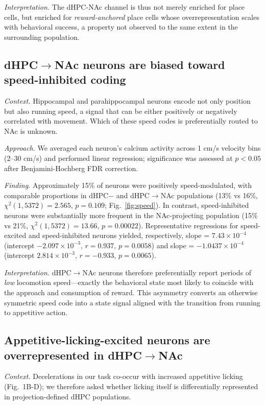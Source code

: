 \documentclass[11pt]{article}
\begin{document}
\textit{Interpretation.} The dHPC-NAc channel is thus not merely enriched for place cells, but enriched for \emph{reward-anchored} place cells whose overrepresentation scales with behavioral success, a property not observed to the same extent in the surrounding population.

\subsection{dHPC$\rightarrow$NAc neurons are biased toward speed-inhibited coding}

\textit{Context.} Hippocampal and parahippocampal neurons encode not only position but also running speed, a signal that can be either positively or negatively correlated with movement. Which of these speed codes is preferentially routed to NAc is unknown.

\textit{Approach.} We averaged each neuron's calcium activity across 1 cm/s velocity bins (2--30 cm/s) and performed linear regression; significance was assessed at $p<0.05$ after Benjamini-Hochberg FDR correction.

\textit{Finding.} Approximately 15\% of neurons were positively speed-modulated, with comparable proportions in dHPC$-$ and dHPC$\rightarrow$NAc populations (13\% vs 16\%, $\chi^2(1,5372)=2.565$, $p=0.109$; Fig.~\ref{fig:speed}). In contrast, speed-inhibited neurons were substantially more frequent in the NAc-projecting population (15\% vs 21\%, $\chi^2(1,5372)=13.66$, $p=0.00022$). Representative regressions for speed-excited and speed-inhibited neurons yielded, respectively, slope = $7.43\times10^{-4}$ (intercept $-2.097\times10^{-3}$, $r=0.937$, $p=0.0058$) and slope = $-1.0437\times10^{-4}$ (intercept $2.814\times10^{-3}$, $r=-0.933$, $p=0.0065$).

\textit{Interpretation.} dHPC$\rightarrow$NAc neurons therefore preferentially report periods of \emph{low} locomotion speed---exactly the behavioral state most likely to coincide with the approach and consumption of reward. This asymmetry converts an otherwise symmetric speed code into a state signal aligned with the transition from running to appetitive action.

\subsection{Appetitive-licking-excited neurons are overrepresented in dHPC$\rightarrow$NAc}

\textit{Context.} Decelerations in our task co-occur with increased appetitive licking (Fig.~1B-D); we therefore asked whether licking itself is differentially represented in projection-defined dHPC populations.
\end{document}
